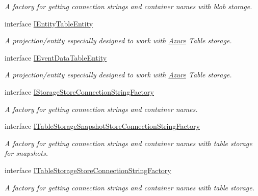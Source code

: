 \begin{DoxyCompactItemize}
\begin{DoxyCompactList}\small\item\em A factory for getting connection strings and container names with blob storage. \end{DoxyCompactList}\item 
interface \hyperlink{interfaceCqrs_1_1Azure_1_1BlobStorage_1_1IEntityTableEntity}{I\+Entity\+Table\+Entity}
\begin{DoxyCompactList}\small\item\em A projection/entity especially designed to work with \hyperlink{namespaceCqrs_1_1Azure}{Azure} Table storage. \end{DoxyCompactList}\item 
interface \hyperlink{interfaceCqrs_1_1Azure_1_1BlobStorage_1_1IEventDataTableEntity}{I\+Event\+Data\+Table\+Entity}
\begin{DoxyCompactList}\small\item\em A projection/entity especially designed to work with \hyperlink{namespaceCqrs_1_1Azure}{Azure} Table storage. \end{DoxyCompactList}\item 
interface \hyperlink{interfaceCqrs_1_1Azure_1_1BlobStorage_1_1IStorageStoreConnectionStringFactory}{I\+Storage\+Store\+Connection\+String\+Factory}
\begin{DoxyCompactList}\small\item\em A factory for getting connection strings and container names. \end{DoxyCompactList}\item 
interface \hyperlink{interfaceCqrs_1_1Azure_1_1BlobStorage_1_1ITableStorageSnapshotStoreConnectionStringFactory}{I\+Table\+Storage\+Snapshot\+Store\+Connection\+String\+Factory}
\begin{DoxyCompactList}\small\item\em A factory for getting connection strings and container names with table storage for snapshots. \end{DoxyCompactList}\item 
interface \hyperlink{interfaceCqrs_1_1Azure_1_1BlobStorage_1_1ITableStorageStoreConnectionStringFactory}{I\+Table\+Storage\+Store\+Connection\+String\+Factory}
\begin{DoxyCompactList}\small\item\em A factory for getting connection strings and container names with table storage. \end{DoxyCompactList}\item 

\end{DoxyCompactItemize}
